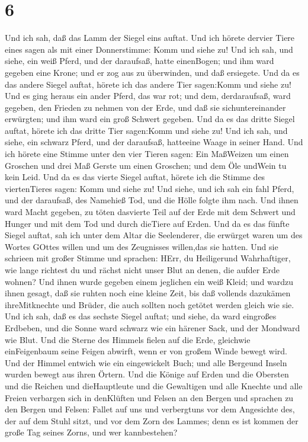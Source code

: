 \hypertarget{section-4}{%
\section{6}\label{section-4}}

 Und ich sah, daß das Lamm der Siegel eins auftat. Und ich
hörete dervier Tiere eines sagen als mit einer Donnerstimme: Komm und
siehe zu!  Und ich sah, und siehe, ein weiß Pferd, und der
daraufsaß, hatte einenBogen; und ihm ward gegeben eine Krone; und er zog
aus zu überwinden, und daß ersiegete.  Und da es das andere
Siegel auftat, hörete ich das andere Tier sagen:Komm und siehe zu!
 Und es ging heraus ein ander Pferd, das war rot; und dem,
derdaraufsaß, ward gegeben, den Frieden zu nehmen von der Erde, und daß
sie sichuntereinander erwürgten; und ihm ward ein groß Schwert gegeben.
 Und da es das dritte Siegel auftat, hörete ich das dritte
Tier sagen:Komm und siehe zu! Und ich sah, und siehe, ein schwarz Pferd,
und der daraufsaß, hatteeine Waage in seiner Hand.  Und ich
hörete eine Stimme unter den vier Tieren sagen: Ein MaßWeizen um einen
Groschen und drei Maß Gerste um einen Groschen; und dem Öle undWein tu
kein Leid.  Und da es das vierte Siegel auftat, hörete ich
die Stimme des viertenTieres sagen: Komm und siehe zu!  Und
siehe, und ich sah ein fahl Pferd, und der daraufsaß, des Namehieß Tod,
und die Hölle folgte ihm nach. Und ihnen ward Macht gegeben, zu töten
dasvierte Teil auf der Erde mit dem Schwert und Hunger und mit dem Tod
und durch dieTiere auf Erden.  Und da es das fünfte Siegel
auftat, sah ich unter dem Altar die Seelenderer, die erwürget waren um
des Wortes GOttes willen und um des Zeugnisses willen,das sie hatten.
 Und sie schrieen mit großer Stimme und sprachen: HErr, du
Heiligerund Wahrhaftiger, wie lange richtest du und rächst nicht unser
Blut an denen, die aufder Erde wohnen?  Und ihnen wurde
gegeben einem jeglichen ein weiß Kleid; und wardzu ihnen gesagt, daß sie
ruhten noch eine kleine Zeit, bis daß vollends dazukämen ihreMitknechte
und Brüder, die auch sollten noch getötet werden gleich wie sie.
 Und ich sah, daß es das sechste Siegel auftat; und siehe,
da ward eingroßes Erdbeben, und die Sonne ward schwarz wie ein härener
Sack, und der Mondward wie Blut.  Und die Sterne des
Himmels fielen auf die Erde, gleichwie einFeigenbaum seine Feigen
abwirft, wenn er von großem Winde bewegt wird.  Und der
Himmel entwich wie ein eingewickelt Buch; und alle Bergeund Inseln
wurden bewegt aus ihren Örtern.  Und die Könige auf Erden
und die Obersten und die Reichen und dieHauptleute und die Gewaltigen
und alle Knechte und alle Freien verbargen sich in denKlüften und Felsen
an den Bergen  und sprachen zu den Bergen und Felsen:
Fallet auf uns und verbergtuns vor dem Angesichte des, der auf dem Stuhl
sitzt, und vor dem Zorn des Lammes;  denn es ist kommen der
große Tag seines Zorns, und wer kannbestehen?

